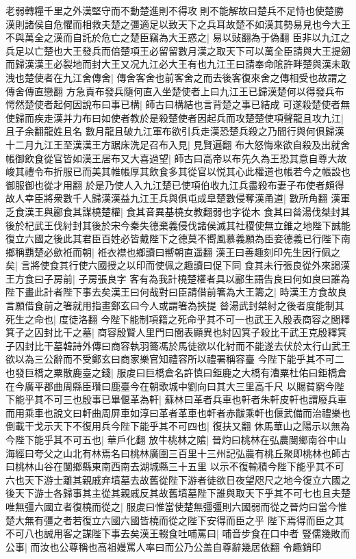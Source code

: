老弱轉糧千里之外漢堅守而不動楚進則不得攻則不能解故曰楚兵不足恃也使楚勝漢則諸侯自危懼而相救夫楚之彊適足以致天下之兵耳故楚不如漢其勢易見也今大王不與萬全之漢而自託於危亡之楚臣竊為大王惑之|{
	易以䜴翻為于偽翻}
臣非以九江之兵足以亡楚也大王發兵而倍楚項王必留留數月漢之取天下可以萬全臣請與大王提劒而歸漢漢王必裂地而封大王又况九江必大王有也九江王曰請奉命隂許畔楚與漢未敢洩也楚使者在九江舍傳舍|{
	傳舍客舍也前客舍之而去後客復來舍之傳相受也故謂之傳舍傳直戀翻}
方急責布發兵隨何直入坐楚使者上曰九江王已歸漢楚何以得發兵布愕然楚使者起何因說布曰事已構|{
	師古曰構結也言背楚之事已結成}
可遂殺楚使者無使歸而疾走漢并力布曰如使者教於是殺楚使者因起兵而攻楚楚使項聲龍且攻九江|{
	且子余翻龍姓且名}
數月龍且破九江軍布欲引兵走漢恐楚兵殺之乃間行與何俱歸漢十二月九江王至漢漢王方踞床洗足召布入見|{
	見賢遍翻}
布大怒悔來欲自殺及出就舍帳御飲食從官皆如漢王居布又大喜過望|{
	師古曰高帝以布先久為王恐其意自尊大故峻其禮令布折服已而美其帷帳厚其飲食多其從官以悦其心此權道也帳若今之帳設也御服御也從才用翻}
於是乃使人入九江楚已使項伯收九江兵盡殺布妻子布使者頗得故人幸臣將衆數千人歸漢漢益九江王兵與俱屯成臯楚數侵奪漢甬道|{
	數所角翻}
漢軍乏食漢王與酈食其謀橈楚權|{
	食其音異基橈女教翻弱也字從木}
食其曰㫺湯伐桀封其後於杞武王伐紂封其後於宋今秦失德棄義侵伐諸侯滅其社稷使無立錐之地陛下誠能復立六國之後此其君臣百姓必皆戴陛下之德莫不嚮風慕義願為臣妾德義已行陛下南鄉稱覇楚必歛袵而朝|{
	袵衣襟也鄉讀曰嚮朝直遥翻}
漢王曰善趣刻印先生因行佩之矣|{
	言將使食其行使六國授之以印而使佩之趣讀曰促下同}
食其未行張良從外來謁漢王方食曰子房前|{
	子房張良字}
客有為我計橈楚權者具以酈生語告良曰何如良曰誰為陛下畫此計者陛下事去矣漢王曰何哉對曰臣請借前箸為大王籌之|{
	時漢王方食故良言願借食前之箸就用指畫鄭玄曰今人或謂箸為挾提}
㫺湯武封桀紂之後者度能制其死生之命也|{
	度徒洛翻}
今陛下能制項籍之死命乎其不可一也武王入殷表商容之閭釋箕子之囚封比干之墓|{
	商容殷賢人里門曰閭表顯異也紂囚箕子殺比干武王克殷釋箕子囚封比干墓韓詩外傳曰商容執羽籥馮於馬徒欲以化紂而不能遂去伏於太行山武王欲以為三公辭而不受鄭玄曰商家樂官知禮容所以禮署稱容臺}
今陛下能乎其不可二也發巨橋之粟散鹿臺之錢|{
	服䖍曰巨橋倉名許慎曰鉅鹿之大橋有漕粟杜佑曰鉅橋倉在今廣平郡曲周縣臣瓚曰鹿臺今在朝歌城中劉向曰其大三里高千尺}
以賜貧窮今陛下能乎其不可三也殷事已畢偃革為軒|{
	蘇林曰革者兵車也軒者朱軒皮軒也謂廢兵車而用乘車也說文曰軒曲周屏車如淳曰革者革車也軒者赤黻乘軒也偃武備而治禮樂也}
倒載干戈示天下不復用兵今陛下能乎其不可四也|{
	復扶又翻}
休馬華山之陽示以無為今陛下能乎其不可五也|{
	華戶化翻}
放牛桃林之隂|{
	晉灼曰桃林在弘農閺鄉南谷中山海經曰夸父之山北有林焉名曰桃林廣圍三百里十三州記弘農有桃丘聚即桃林也師古曰桃林山谷在閺鄉縣東南西南去湖城縣三十五里}
以示不復輸積今陛下能乎其不可六也天下游士離其親戚弃墳墓去故舊從陛下游者徒欲日夜望咫尺之地今復立六國之後天下游士各歸事其主從其親戚反其故舊墳墓陛下誰與取天下乎其不可七也且夫楚唯無彊六國立者復橈而從之|{
	服䖍曰惟當使楚無彊彊則六國弱而從之晉灼曰當今惟楚大無有彊之者若復立六國六國皆橈而從之陛下安得而臣之乎}
陛下焉得而臣之其不可八也誠用客之謀陛下事去矣漢王輟食吐哺罵曰|{
	哺音步食在口中者}
豎儒幾敗而公事|{
	而汝也公尊稱也高祖嫚罵人率曰而公乃公盖自尊辭幾居依翻}
令趣銷印

